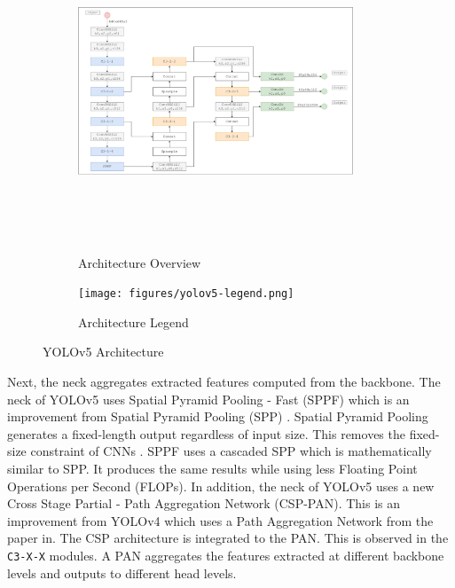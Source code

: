 \documentclass[12pt,a4paper,fleqn]{report}
\begin{document}
\begin{figure}[htbp]
    \centering
    \begin{subfigure}[htbp]{\textwidth}
        \begin{center}
            \includegraphics[width=0.9\textwidth,height=9.5cm]{figures/yolov5-arch.png}
        \end{center}
        \caption{Architecture Overview}
        \label{fig:yolov5-architecture-overview}
    \end{subfigure}
    \centering
    \begin{subfigure}[htbp]{\textwidth}
        \begin{center}
            \texttt{[image: figures/yolov5-legend.png]}
        \end{center}
        \caption{Architecture Legend}
        \label{fig:yolov5-architecture-legend}
    \end{subfigure}
    \caption{YOLOv5 Architecture}
    \label{fig:yolov5-architecture}
\end{figure}

Next, the neck aggregates extracted features computed from the backbone.
The neck of YOLOv5 uses Spatial Pyramid Pooling - Fast (SPPF) which is an improvement from Spatial Pyramid
Pooling (SPP) \cite{spp:2014}.
Spatial Pyramid Pooling generates a fixed-length output regardless of input size.
This removes the fixed-size constraint of CNNs \cite{spp:2014}.
SPPF uses a cascaded SPP which is mathematically similar to SPP.
It produces the same results while using less Floating Point Operations per Second (FLOPs).
In addition, the neck of YOLOv5 uses a new Cross Stage Partial - Path Aggregation Network (CSP-PAN).
This is an improvement from YOLOv4 which uses a Path Aggregation Network from the paper
in\cite{pan:2018}.
The CSP architecture is integrated to the PAN.
This is observed in the \texttt{C3-X-X} modules.
A PAN aggregates the features extracted at different backbone levels and outputs to different
head levels.
\end{document}
